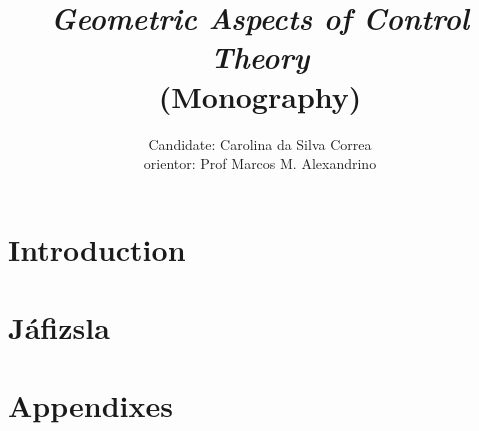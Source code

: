 \documentclass[11pt, reqno]{amsart}
\newcommand{\<}[0]{\langle}
\renewcommand{\>}[0]{\rangle}
\begin{document}
\title[Geometric Aspects of Control Theory]{ \emph{Geometric Aspects of Control Theory}
\\ \footnotesize{(Monography)}}
\author[Carolina da Silva Correa, M. Alexandrino]{Candidate: Carolina da Silva Correa 
\\orientor: Prof Marcos M. Alexandrino}
\maketitle


\tableofcontents

\pagebreak


\part{Introduction}



\part{Jáfizsla}



\part{Appendixes}
\label{apdx:EDOs}
\end{document}
